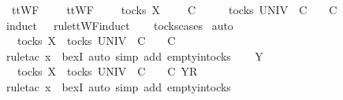 \ \ {\isachardoublequoteopen}ttWF\ {\isacharparenleft}{\isasymrho}{\isacharprime}\ {\isacharat}\ {\isasymsigma}{\isacharprime}{\isacharparenright}\ {\isasymLongrightarrow}\ ttWF\ {\isasymsigma}\ {\isasymLongrightarrow}\ {\isasymrho}{\isacharprime}\ {\isasymin}\ tocks\ X\ {\isasymand}\ {\isasymrho}{\isacharprime}\ {\isacharat}\ {\isasymsigma}{\isacharprime}\ {\isasymsubseteq}\isactrlsub C\ {\isasymsigma}\ {\isasymLongrightarrow}\ {\isasymexists}\ {\isasymrho}\ {\isasymin}\ tocks\ UNIV{\isachardot}\ {\isasymrho}{\isacharprime}\ {\isasymsubseteq}\isactrlsub C\ {\isasymrho}\ {\isasymand}\ {\isasymrho}\ {\isasymle}\isactrlsub C\ {\isasymsigma}{\isachardoublequoteclose}\isanewline
%
\isadelimproof
\ \ %
\endisadelimproof
%
\isatagproof
{}\isamarkupfalse%
\ {\isacharparenleft}induct\ {\isasymrho}{\isacharprime}\ {\isasymsigma}\ rule{\isacharcolon}ttWF{}{\isachardot}induct{\isacharparenright}\isanewline
\ \ \isamarkupfalse%
\ tocks{\isachardot}cases\isanewline
{}\isamarkupfalse%
\ auto\isanewline
\ \ \isamarkupfalse%
\ {\isachardoublequoteopen}{\isacharbrackleft}{\isacharbrackright}\ {\isasymin}\ tocks\ X\ {\isasymLongrightarrow}\ {\isasymexists}{\isasymrho}{\isasymin}tocks\ UNIV{\isachardot}\ {\isacharbrackleft}{\isacharbrackright}\ {\isasymsubseteq}\isactrlsub C\ {\isasymrho}\ {\isasymand}\ {\isasymrho}\ {\isasymle}\isactrlsub C\ {\isacharbrackleft}{\isacharbrackright}{\isachardoublequoteclose}\isanewline
\ \ \ \ \isamarkupfalse%
\ {\isacharparenleft}rule{\isacharunderscore}tac\ x{\isacharequal}{\isachardoublequoteopen}{\isacharbrackleft}{\isacharbrackright}{\isachardoublequoteclose}\ \ bexI{\isacharcomma}\ auto\ simp\ add{\isacharcolon}\ empty{\isacharunderscore}in{\isacharunderscore}tocks{\isacharparenright}\isanewline
{}\isamarkupfalse%
\isanewline
\ \ \isamarkupfalse%
\ Y\isanewline
\ \ \isamarkupfalse%
\ {\isachardoublequoteopen}{\isacharbrackleft}{\isacharbrackright}\ {\isasymin}\ tocks\ X\ {\isasymLongrightarrow}\ {\isasymexists}{\isasymrho}{\isasymin}tocks\ UNIV{\isachardot}\ {\isacharbrackleft}{\isacharbrackright}\ {\isasymsubseteq}\isactrlsub C\ {\isasymrho}\ {\isasymand}\ {\isasymrho}\ {\isasymle}\isactrlsub C\ {\isacharbrackleft}{\isacharbrackleft}Y{\isacharbrackright}\isactrlsub R{\isacharbrackright}{\isachardoublequoteclose}\isanewline
\ \ \ \ \isamarkupfalse%
\ {\isacharparenleft}rule{\isacharunderscore}tac\ x{\isacharequal}{\isachardoublequoteopen}{\isacharbrackleft}{\isacharbrackright}{\isachardoublequoteclose}\ \ bexI{\isacharcomma}\ auto\ simp\ add{\isacharcolon}\ empty{\isacharunderscore}in{\isacharunderscore}tocks{\isacharparenright}\isanewline
